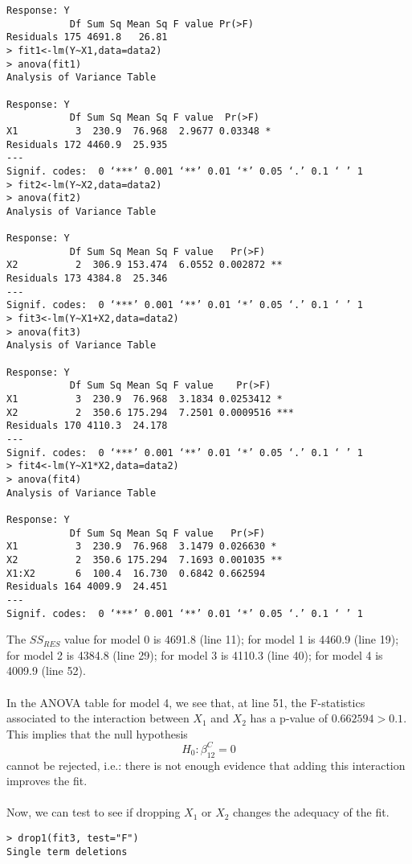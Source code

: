 \documentclass[10pt]{article}
\begin{document}
\begin{enumerate}
\begin{enumerate}[(a)]
\begin{lstlisting}
Response: Y
           Df Sum Sq Mean Sq F value Pr(>F)
Residuals 175 4691.8   26.81               
> fit1<-lm(Y~X1,data=data2)
> anova(fit1)
Analysis of Variance Table

Response: Y
           Df Sum Sq Mean Sq F value  Pr(>F)  
X1          3  230.9  76.968  2.9677 0.03348 *
Residuals 172 4460.9  25.935                  
---
Signif. codes:  0 ‘***’ 0.001 ‘**’ 0.01 ‘*’ 0.05 ‘.’ 0.1 ‘ ’ 1
> fit2<-lm(Y~X2,data=data2)
> anova(fit2)
Analysis of Variance Table

Response: Y
           Df Sum Sq Mean Sq F value   Pr(>F)   
X2          2  306.9 153.474  6.0552 0.002872 **
Residuals 173 4384.8  25.346                    
---
Signif. codes:  0 ‘***’ 0.001 ‘**’ 0.01 ‘*’ 0.05 ‘.’ 0.1 ‘ ’ 1
> fit3<-lm(Y~X1+X2,data=data2)
> anova(fit3)
Analysis of Variance Table

Response: Y
           Df Sum Sq Mean Sq F value    Pr(>F)    
X1          3  230.9  76.968  3.1834 0.0253412 *  
X2          2  350.6 175.294  7.2501 0.0009516 ***
Residuals 170 4110.3  24.178                      
---
Signif. codes:  0 ‘***’ 0.001 ‘**’ 0.01 ‘*’ 0.05 ‘.’ 0.1 ‘ ’ 1
> fit4<-lm(Y~X1*X2,data=data2)
> anova(fit4)
Analysis of Variance Table

Response: Y
           Df Sum Sq Mean Sq F value   Pr(>F)   
X1          3  230.9  76.968  3.1479 0.026630 * 
X2          2  350.6 175.294  7.1693 0.001035 **
X1:X2       6  100.4  16.730  0.6842 0.662594   
Residuals 164 4009.9  24.451                    
---
Signif. codes:  0 ‘***’ 0.001 ‘**’ 0.01 ‘*’ 0.05 ‘.’ 0.1 ‘ ’ 1
			\end{lstlisting}
			
		The $SS_{RES}$ value for model 0 is 4691.8 (line 11); for model 1 is 4460.9 (line 19); for model 2 is 4384.8 (line 29); for model 3 is 4110.3 (line 40); for model 4 is 4009.9 (line 52).
		\\\\
		In the ANOVA table for model 4, we see that, at line 51, the F-statistics associated to the interaction between $X_1$ and $X_2$ has a p-value of $0.662594 > 0.1$. This implies that the null hypothesis 
		\begin{displaymath}
			H_0: \beta_{12}^C = 0
		\end{displaymath}
		 cannot be rejected, i.e.: there is not enough evidence that adding this interaction improves the fit. 
		 \\\\
		 Now, we can test to see if dropping $X_1$ or $X_2$ changes the adequacy of the fit. 
		 \begin{lstlisting}
> drop1(fit3, test="F")
Single term deletions


\end{lstlisting}
\end{enumerate}
\end{enumerate}
\end{document}
